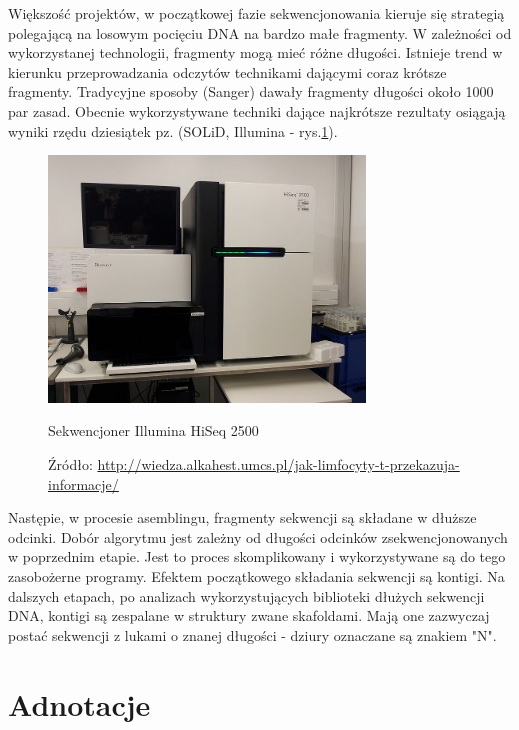 Większość projektów, w początkowej fazie sekwencjonowania kieruje się strategią polegającą na losowym pocięciu DNA na bardzo małe fragmenty.
W zależności od wykorzystanej technologii, fragmenty mogą mieć różne długości. Istnieje trend w kierunku przeprowadzania odczytów technikami dającymi coraz krótsze fragmenty. 
Tradycyjne sposoby (Sanger) dawały fragmenty długości około 1000 par zasad. Obecnie wykorzystywane techniki dające najkrótsze rezultaty osiągają wyniki rzędu dziesiątek pz. (SOLiD, Illumina - rys.\ref{img:sekwencjoner-illumina}).

\begin{figure}[h]
	\centering
	\includegraphics[width=0.75\textwidth]{img/sekwencjoner-illumina.jpg}
	\caption{Sekwencjoner Illumina HiSeq 2500}
	\vspace{-0.5cm}
	\caption*{\scriptsize Źródło: \url{http://wiedza.alkahest.umcs.pl/jak-limfocyty-t-przekazuja-informacje/}}
	\label{img:sekwencjoner-illumina}
\end{figure}

Następie, w procesie asemblingu, fragmenty sekwencji są składane w dłuższe odcinki. Dobór algorytmu jest zależny od długości odcinków zsekwencjonowanych w poprzednim etapie. Jest to proces skomplikowany i wykorzystywane są do tego zasobożerne programy. 
Efektem początkowego składania sekwencji są kontigi.
Na dalszych etapach, po analizach wykorzystujących biblioteki dłużych sekwencji DNA, kontigi są zespalane w struktury zwane skafoldami.
Mają one zazwyczaj postać sekwencji z lukami o znanej długości - dziury oznaczane są znakiem "N".

\section{Adnotacje}

